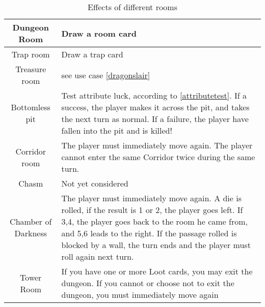 \documentclass[a4paper,10pt]{report}
\begin{document}
\begin{table}
\caption{Effects of different rooms}
\label{roomeffects}
\begin{tabular}{|c| p{9cm} |}
\hline
Dungeon Room & Draw a room card \\\hline
Trap room & Draw a trap card \\\hline
Treasure room & see use case \ref{dragonslair} \\\hline
Bottomless pit & Test attribute luck, according to \ref{attributetest}. If a success, the player makes it across the pit, and takes the next turn as normal. If a failure, the player have fallen into the pit and is killed! \\\hline
Corridor room & The player must immediately move again. The player cannot enter the same Corridor twice during the same turn.\\\hline
Chasm & Not yet considered \\ \hline
Chamber of Darkness & The player must immediately move again. A die is rolled, if the result is 1 or 2, the player goes left. If 3,4, the player goes back to the room he came from, and 5,6 leads to the right. If the passage rolled is blocked by a wall, the turn ends and the player must roll again next turn.\\\hline
Tower Room & If you have one or more Loot cards, you may exit the dungeon. If you cannot or choose not to exit the dungeon, you must immediately move again \\

\hline
\end{tabular}
\end{table}
\end{document}
